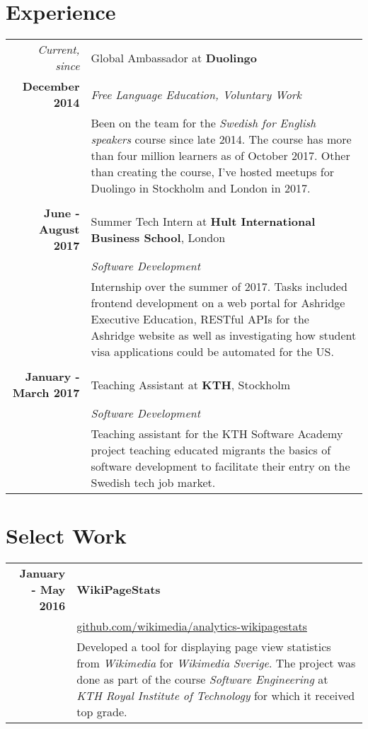 \documentclass[a4paper,10pt]{article}
\begin{document}
\section{Experience}
\begin{tabular}{r|p{11cm}}
\emph{Current, since} & Global Ambassador at \textbf{Duolingo}\\\textbf{December 2014}&\emph{Free Language Education, Voluntary Work}\\&\footnotesize{Been on the team for the \emph{Swedish for English speakers} course since late 2014. The course has more than four million learners as of October 2017. Other than creating the course, I've hosted meetups for Duolingo in Stockholm and London in 2017.}\\ \\

\textbf{June - August 2017} & Summer Tech Intern at \textbf{Hult International Business School}, London \\
& \emph{Software Development} \\
& \footnotesize{Internship over the summer of 2017. Tasks included frontend development on a web portal for Ashridge Executive Education, RESTful APIs for the Ashridge website as well as investigating how student visa applications could be automated for the US.} \\ \\

\textbf{January - March 2017} & Teaching Assistant at \textbf{KTH}, Stockholm \\
& \emph{Software Development} \\
& \footnotesize{Teaching assistant for the KTH Software Academy project teaching educated migrants the basics of software development to facilitate their entry on the Swedish tech job market.} \\
\end{tabular}

\section{Select Work}
\begin{tabular}{r|p{11cm}}
\textbf{January - May 2016} & \textbf{WikiPageStats} \\
& \href{https://github.com/wikimedia/analytics-wikipagestats}{github.com/wikimedia/analytics-wikipagestats} \\
& \footnotesize{Developed a tool for displaying page view statistics from \emph{Wikimedia} for \emph{Wikimedia Sverige}. The project was done as part of the course \emph{Software Engineering} at \emph{KTH Royal Institute of Technology} for which it received top grade.}
\end{tabular}
\end{document}
